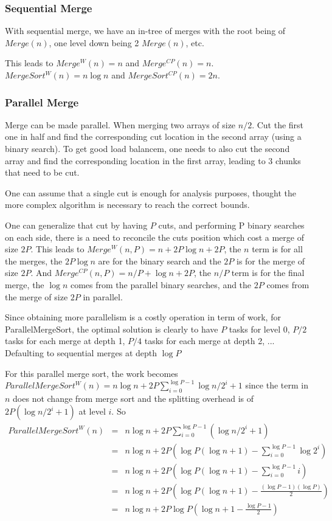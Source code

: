\documentclass{article}
\begin{document}
\subsubsection{Sequential Merge}

With sequential merge, we have an in-tree of merges with the root
being of $Merge(n)$, one level down being 2 $Merge(n)$, etc.

This leads to $Merge^W(n) = n$ and $Merge^{CP}(n)=n$. $MergeSort^W(n)
= n \log n$ and $MergeSort^{CP}(n) = 2n$.

\subsubsection{Parallel Merge}

Merge can be made parallel. When merging two arrays of size $n/2$. Cut
the first one in half and find the corresponding cut location in the
second array (using a binary search). To get good load balancem, one
needs to also cut the second array and find the corresponding location
in the first array, leading to 3 chunks that need to be cut.

One can assume that a single cut is enough for analysis purposes,
thought the more complex algorithm is necessary to reach the correct
bounds.

One can generalize that cut by having $P$ cuts, and performing P
binary searches on each side, there is a need to reconcile the cuts
position which cost a merge of size $2P$. This leads to $Merge^W(n,P) =
n + 2 P \log n + 2P$, the $n$ term is for all the merges, the $2P \log
n$ are for the binary search and the $2P$ is for the merge of size
$2P$. And $Merge^{CP}(n,P) = n/P + \log n + 2P$, the $n/P$ term
is for the final merge, the $\log n$ comes from the parallel binary
searches, and the $2P$ comes from the merge of size $2P$ in parallel.

Since obtaining more parallelism is a costly operation in term of
work, for ParallelMergeSort, the optimal solution is clearly to have
$P$ tasks for level 0, $P/2$ tasks for each merge at depth 1,
$P/4$ tasks for each merge at depth 2, ... Defaulting to sequential
merges at depth $\log P$

For this parallel merge sort, the work becomes
$ParallelMergeSort^W(n) = n \log n + 2 P \sum_{i=0}^{\log P - 1} \log n/2^i + 1$
since the term in $n$ does not change
from merge sort and the splitting overhead is of $2P (\log n/2^i + 1)$ at
level $i$. So
\begin{align}
  ParallelMergeSort^W(n) & = & n \log n + 2 P \sum_{i=0}^{\log P - 1}( \log n/2^i + 1  )\\
  & = &n \log n + 2 P \left (\log P (\log n +1)- \sum_{i=0}^{\log P - 1} \log 2^i  \right )  \\
  & = &n \log n + 2 P \left (\log P (\log n +1)- \sum_{i=0}^{\log P - 1} i \right )  \\
  & = &n \log n + 2 P \left ( \log P (\log n +1)- \frac{(\log P - 1)(\log P)}{2}   \right) \\
  & = &n \log n + 2 P \log P \left (  \log n + 1 - \frac{\log P - 1}{2}   \right)  
\end{align}
\end{document}
